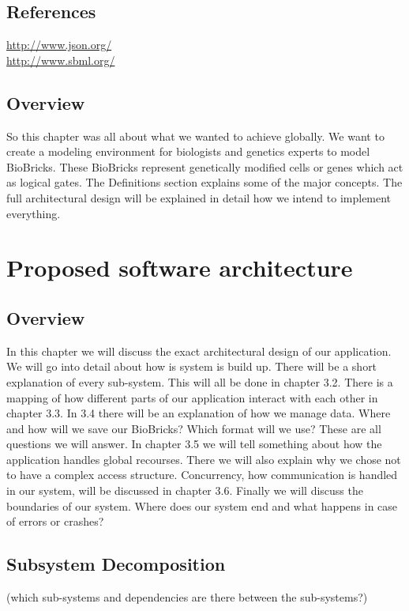 \documentclass[a4paper]{article}
\begin{document}
\subsection{References}
\begin{description}
	\item[\url{http://www.json.org/}]
	\item[\url{http://www.sbml.org/}]
\end{description}

\subsection{Overview}
So this chapter was all about what we wanted to achieve globally. We want to create a modeling environment for biologists and genetics experts to model BioBricks. These BioBricks represent genetically modified cells or genes which act as logical gates. The Definitions section explains some of the major concepts. The full architectural design will be explained in detail how we intend to implement everything.

\section{Proposed software architecture}
\subsection{Overview}
In this chapter we will discuss the exact architectural design of our application. We will go into detail about how is system is build up. There will be a short explanation of every sub-system. This will all be done in chapter 3.2. There is a mapping of how different parts of our application interact with each other in chapter 3.3. In 3.4 there will be an explanation of how we manage data. Where and how will we save our BioBricks? Which format will we use? These are all questions we will answer. In chapter 3.5 we will tell something about how the application handles global recourses. There we will also explain why we chose not to have a complex access structure. Concurrency, how communication is handled in our system, will be discussed in chapter 3.6. Finally we will discuss the boundaries of our system. Where does our system end and what happens in case of errors or crashes? 
\subsection{Subsystem Decomposition}
(which sub-systems and dependencies are there between the sub-systems?)
\end{document}
